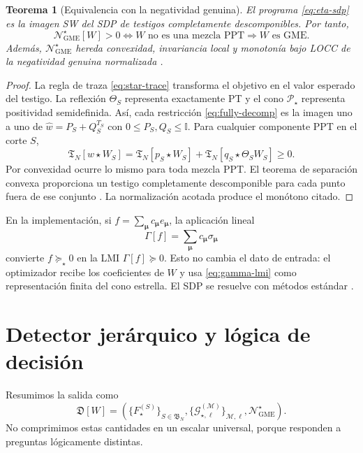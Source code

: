 \documentclass[11pt,a4paper]{article}
\newcommand{\id}{\mathbb I}
\newcommand{\Tfun}{\mathfrak T}
\newcommand{\Fstar}{F_{\star}}
\newcommand{\Ngstar}{\mathcal N_{\mathrm{GME}}^{\star}}
\newcommand{\Pstar}{\mathcal P_{\star}}
\newcommand{\starprod}{\star}
\newtheorem{theorem}{Teorema}
\theoremstyle{definition}
\begin{document}
\begin{theorem}[Equivalencia con la negatividad genuina]
El programa \eqref{eq:eta-sdp} es la imagen SW del SDP de testigos completamente
descomponibles. Por tanto,
\begin{equation}
 \Ngstar[W]>0
 \iff W\text{ no es una mezcla PPT}
 \Longrightarrow W\text{ es GME}.
 \label{eq:Ngstar-theorem}
\end{equation}
Además, $\Ngstar$ hereda convexidad, invariancia local y monotonía bajo LOCC de
la negatividad genuina normalizada
\cite{Jungnitsch2011PPTMixtures}.
\end{theorem}

\begin{proof}
La regla de traza \eqref{eq:star-trace} transforma el objetivo en el valor
esperado del testigo. La reflexión $\Theta_S$ representa exactamente PT y el
cono $\Pstar$ representa positividad semidefinida. Así, cada restricción
\eqref{eq:fully-decomp} es la imagen uno a uno de
$\widehat w=P_S+Q_S^{T_S}$ con $0\leq P_S,Q_S\leq\id$. Para cualquier componente
PPT en el corte $S$,
\begin{equation}
 \Tfun_N[w\starprod W_S]
 =\Tfun_N[p_S\starprod W_S]
 +\Tfun_N[q_S\starprod\Theta_SW_S]\geq0.
\end{equation}
Por convexidad ocurre lo mismo para toda mezcla PPT. El teorema de separación
convexa proporciona un testigo completamente descomponible para cada punto
fuera de ese conjunto \cite{Jungnitsch2011PPTMixtures}. La normalización acotada
produce el monótono citado.
\end{proof}

En la implementación, si
$f=\sum_{\bm\mu}c_{\bm\mu}e_{\bm\mu}$, la aplicación lineal
\begin{equation}
 \Gamma[f]=\sum_{\bm\mu}c_{\bm\mu}\sigma_{\bm\mu}
 \label{eq:gamma-lmi}
\end{equation}
convierte $f\succeq_\star0$ en la LMI $\Gamma[f]\succeq0$. Esto no cambia el
dato de entrada: el optimizador recibe los coeficientes de $W$ y usa
\eqref{eq:gamma-lmi} como representación finita del cono estrella. El SDP se
resuelve con métodos estándar \cite{VandenbergheBoyd1996SDP}.

\section{Detector jerárquico y lógica de decisión}

Resumimos la salida como
\begin{equation}
 \mathfrak D[W]=\left(
 \{\Fstar^{(S)}\}_{S\in\mathfrak B_N},
 \{\mathcal G_{\star,\ell}^{(\mathcal M)}\}_{\mathcal M,\ell},
 \Ngstar\right).
 \label{eq:hierarchical-detector}
\end{equation}
No comprimimos estas cantidades en un escalar universal, porque responden a
preguntas lógicamente distintas.
\end{document}
